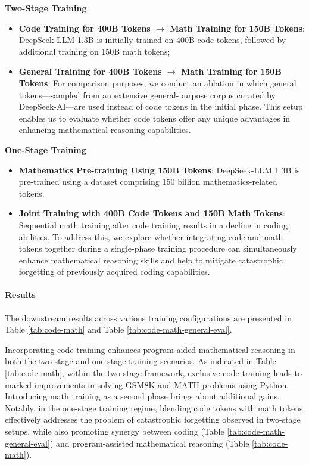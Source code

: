 \begin{itemize}[topsep=0pt]
\begin{itemize}[topsep=0pt]
\textbf{Two-Stage Training}

\begin{itemize}[topsep=0pt]
    \item \textbf{Code Training for 400B Tokens $\rightarrow$ Math Training for 150B Tokens}: DeepSeek-LLM 1.3B is initially trained on 400B code tokens, followed by additional training on 150B math tokens;
    \item \textbf{General Training for 400B Tokens $\rightarrow$ Math Training for 150B Tokens}: For comparison purposes, we conduct an ablation in which general tokens—sampled from an extensive general-purpose corpus curated by DeepSeek-AI—are used instead of code tokens in the initial phase. This setup enables us to evaluate whether code tokens offer any unique advantages in enhancing mathematical reasoning capabilities.
\end{itemize}

\textbf{One-Stage Training}

\begin{itemize}[topsep=0pt]
    \item \textbf{Mathematics Pre-training Using 150B Tokens}: DeepSeek-LLM 1.3B is pre-trained using a dataset comprising 150 billion mathematics-related tokens.
    \item \textbf{Joint Training with 400B Code Tokens and 150B Math Tokens}: Sequential math training after code training results in a decline in coding abilities. To address this, we explore whether integrating code and math tokens together during a single-phase training procedure can simultaneously enhance mathematical reasoning skills and help to mitigate catastrophic forgetting of previously acquired coding capabilities.
\end{itemize}

\paragraph{Results}
The downstream results across various training configurations are presented in Table \ref{tab:code-math} and Table \ref{tab:code-math-general-eval}.

Incorporating code training enhances program-aided mathematical reasoning in both the two-stage and one-stage training scenarios. As indicated in Table \ref{tab:code-math}, within the two-stage framework, exclusive code training leads to marked improvements in solving GSM8K and MATH problems using Python. Introducing math training as a second phase brings about additional gains. Notably, in the one-stage training regime, blending code tokens with math tokens effectively addresses the problem of catastrophic forgetting observed in two-stage setups, while also promoting synergy between coding (Table \ref{tab:code-math-general-eval}) and program-assisted mathematical reasoning (Table \ref{tab:code-math}).


\end{itemize}
\end{itemize}
